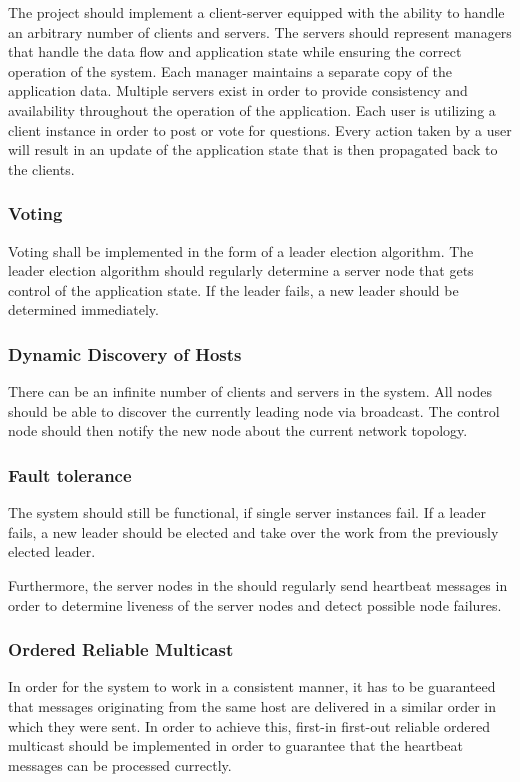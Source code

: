 \documentclass[runningheads]{llncs}
\begin{document}
The project should implement a client-server\cite{berson1996client} equipped
with the ability to handle an arbitrary number of clients and servers. The
servers should represent managers that handle the data flow and application
state while ensuring the correct operation of the system. Each manager
maintains a separate copy of the application data. Multiple servers exist in
order to provide consistency and availability throughout the operation of the
application. Each user is utilizing a client instance in order to post or vote
for questions. Every action taken by a user will result in an update of the
application state that is then propagated back to the clients.

\subsubsection{Voting}
Voting shall be implemented in the form of a leader election algorithm. The leader
election algorithm should regularly determine a server node that gets control
of the application state. If the leader fails, a new leader should be determined
immediately. 

\subsubsection{Dynamic Discovery of Hosts}
There can be an infinite number of clients and servers in the system. All nodes should
be able to discover the currently leading node via broadcast. The control node should then
notify the new node about the current network topology.

\subsubsection{Fault tolerance}
The system should still be functional, if single server instances fail. If a leader
fails, a new leader should be elected and take over the work from the previously
elected leader. 

Furthermore, the server nodes in the should regularly send heartbeat messages in order
to determine liveness of the server nodes and detect possible node failures.

\subsubsection{Ordered Reliable Multicast}
In order for the system to work in a consistent manner, it has to be guaranteed
that messages originating from the same host are delivered in a similar order
in which they were sent. In order to achieve this, first-in first-out reliable
ordered multicast should be implemented in order to guarantee that the heartbeat
messages can be processed currectly.
\end{document}
